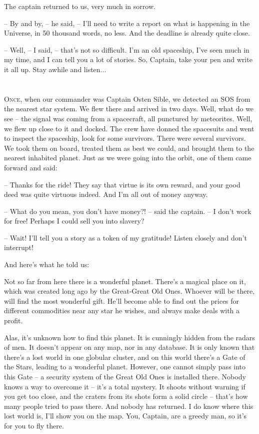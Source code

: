 \documentclass[ebook,twoside,final,openright]{memoir}
\begin{document}
\par
The captain returned to us, very much in sorrow.\par
– By and by, – he said, – I’ll need to write a report on what is happening in the Universe, in 50 thousand words, no less. And the deadline is already quite close.\par
– Well, – I said, – that’s not so difficult. I'm an old spaceship, I’ve seen much in my time, and I can tell you a lot of stories. So, Captain, take your pen and write it all up. Stay awhile and listen...
\chapter{}
\par
\lettrine{O}{nce,} when our commander was Captain Osten Sible, we detected an SOS from the nearest star system. We flew there and arrived in two days. Well, what do we see – the signal was coming from a spacecraft, all punctured by meteorites. Well, we flew up close to it and docked. The crew have donned the spacesuits and went to inspect the spaceship, look for some survivors. There were several survivors. We took them on board, treated them as best we could, and brought them to the nearest inhabited planet. Just as we were going into the orbit, one of them came forward and said: \par
\par
– Thanks for the ride! They say that virtue is its own reward, and your good deed was quite virtuous indeed. And I’m all out of money anyway.\par
– What do you mean, you don’t have money?! – said the captain. – I don’t work for free! Perhaps I could sell you into slavery? \par
– Wait! I'll tell you a story as a token of my gratitude! Listen closely and don’t interrupt! \par
 And here’s what he told us:\par
\par
Not so far from here there is a wonderful planet. There’s a magical place on it, which was created long ago by the Great-Great Old Ones. Whoever will be there, will find the most wonderful gift. He’ll become able to find out the prices for different commodities near any star he wishes, and always make deals with a profit. \par
Alas, it’s unknown how to find this planet. It is cunningly hidden from the radars of men. It doesn’t appear on any map, nor in any database. It is only known that there’s a lost world in one globular cluster, and on this world there’s a Gate of the Stars, leading to a wonderful planet. However, one cannot simply pass into this Gate – a security system of the Great Old Ones is installed there. Nobody knows a way to overcome it – it’s a total mystery. It shoots without warning if you get too close, and the craters from its shots form a solid circle – that's how many people tried to pass there. And nobody has returned. I do know where this lost world is, I'll show you on the map. You, Captain, are a greedy man, so it’s for you to fly there.\par
\end{document}
